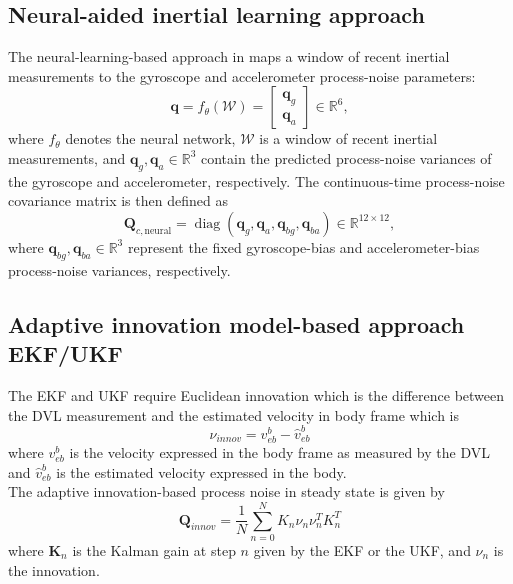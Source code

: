 \documentclass[conference]{IEEEtran}
\begin{document}
\subsection{Neural-aided inertial learning approach}
The neural-learning-based approach in \cite{diker2026neural} maps a
window of recent inertial measurements to the gyroscope and
accelerometer process-noise parameters:
\begin{equation}
\boldsymbol{q}
=
f_{\theta}(\mathcal{W})
=
\begin{bmatrix}
\boldsymbol{q}_{g} \\
\boldsymbol{q}_{a}
\end{bmatrix}
\in \mathbb{R}^{6},
\end{equation}
%
where \(f_{\theta}\) denotes the neural network, \(\mathcal{W}\) is a
window of recent inertial measurements, and
\(\boldsymbol{q}_{g},\boldsymbol{q}_{a}\in\mathbb{R}^{3}\) contain
the predicted process-noise variances of the gyroscope and
accelerometer, respectively.
The continuous-time process-noise covariance matrix is then defined as
\begin{equation}
\mathbf{Q}_{c,\mathrm{neural}}
=
\operatorname{diag}
\left(
\boldsymbol{q}_{g},
\boldsymbol{q}_{a},
\boldsymbol{q}_{bg},
\boldsymbol{q}_{ba}
\right)
\in \mathbb{R}^{12 \times 12},
\end{equation}
%
where
\(\boldsymbol{q}_{bg}, \boldsymbol{q}_{ba} \in \mathbb{R}^{3}\)
represent the fixed gyroscope-bias and accelerometer-bias process-noise
variances, respectively. 
\subsection{Adaptive innovation model-based approach EKF/UKF}
The EKF and UKF require Euclidean innovation which is the difference between the DVL measurement and the estimated velocity in body frame which is
\begin{equation}
  \label{ekf_innovation}
  \nu_{innov} = v^b_{eb} - \hat{v}^b_{eb}
\end{equation}
where \(v^b_{eb}\) is the velocity expressed in the body frame as measured by the DVL and \(\hat{v}^b_{eb}\) is the estimated velocity expressed in the body. \\
The adaptive innovation-based process noise in steady state is given by \cite{mohamed1999adaptive} 
\begin{equation}
  \label{innovation_process_noise}
  \mathbf{Q}_{innov} = \frac{1}{N} \sum_{n=0}^N K_n \nu_n \nu^T_n K_n^T
\end{equation}
where \(\mathbf{K}_n\) is the Kalman gain at step \(n\) given by the EKF or the UKF, and \(\nu_n\) is the innovation.
\end{document}
